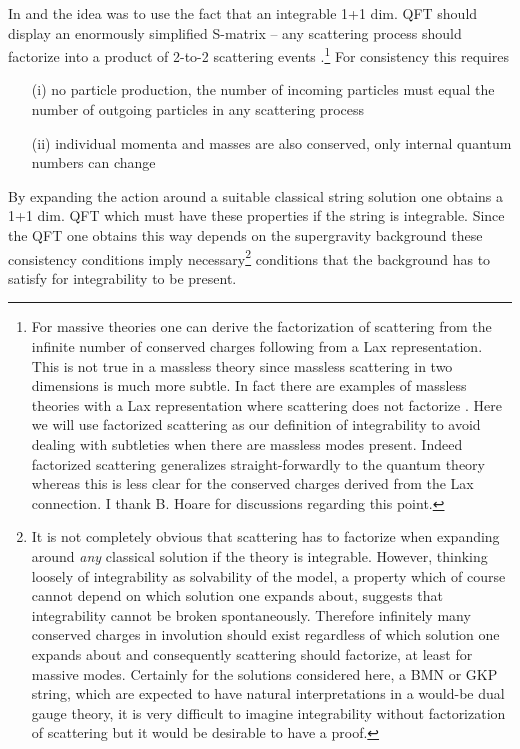 \documentclass[a4paper,11pt]{article}
\begin{document}
In \cite{Wulff:2017hzy} and \cite{Wulff:2017lxh} the idea was to use the fact that an integrable 1+1 dim. QFT should display an enormously simplified S-matrix -- any scattering process should factorize into a product of 2-to-2 scattering events \cite{Arefeva:1974bk,Kulish:1975ba,Vergeles:1976ra,Schroer:1976if,Iagolnitzer:1977sw,Zamolodchikov:1978xm}.\footnote{For massive theories one can derive the factorization of scattering from the infinite number of conserved charges following from a Lax representation. This is not true in a massless theory since massless scattering in two dimensions is much more subtle. In fact there are examples of massless theories with a Lax representation where scattering does not factorize \cite{Nappi:1979ig,Fridling:1983ha,Fradkin:1984ai,Curtright:1994be}. Here we will use factorized scattering as our definition of integrability to avoid dealing with subtleties when there are massless modes present. Indeed factorized scattering generalizes straight-forwardly to the quantum theory whereas this is less clear for the conserved charges derived from the Lax connection. I thank B. Hoare for discussions regarding this point.} For consistency this requires
\begin{itemize}
	\item[(i)] no particle production, the number of incoming particles must equal the number of outgoing particles in any scattering process
	\item[(ii)] individual momenta and masses are also conserved, only internal quantum numbers can change
\end{itemize}
By expanding the action around a suitable classical string solution one obtains a 1+1 dim. QFT which must have these properties if the string is integrable. Since the QFT one obtains this way depends on the supergravity background these consistency conditions imply necessary\footnote{It is not completely obvious that scattering has to factorize when expanding around \emph{any} classical solution if the theory is integrable. However, 
thinking loosely of integrability as solvability of the model, a property which of course cannot depend on which solution one expands about, suggests that integrability cannot be broken spontaneously. Therefore infinitely many conserved charges in involution should exist regardless of which solution one expands about and consequently scattering should factorize, at least for massive modes. Certainly for the solutions considered here, a BMN or GKP string, which are expected to have natural interpretations in a would-be dual gauge theory, it is very difficult to imagine integrability without factorization of scattering but it would be desirable to have a proof.} conditions that the background has to satisfy for integrability to be present.
\end{document}
